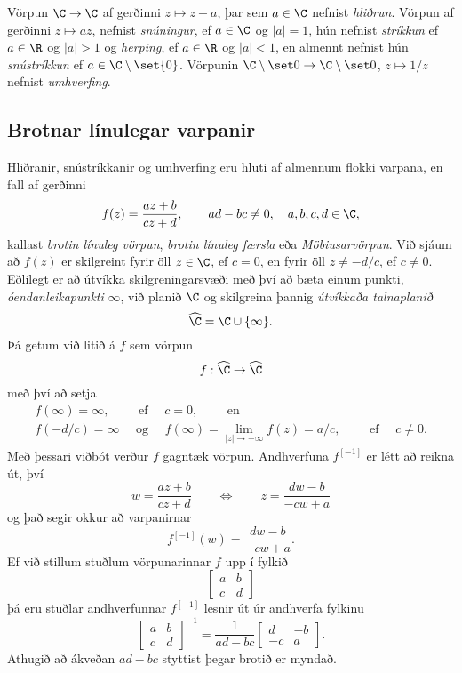 Vörpun $\C\to \C$ af gerðinni $z\mapsto z+a$, þar sem 
$a\in \C$ nefnist {\it hliðrun}.
Vörpun af gerðinni $z\mapsto az$, nefnist
{\it snúningur}, ef $a\in
\C$ og  $|a|=1$, hún nefnist {\it
stríkkun} ef $a\in
\R$ og $|a|>1$ og {\it herping}, ef  
$a\in \R$ og $|a|<1$, en almennt nefnist hún
{\it snústríkkun} ef $a\in \C\setminus\set{0}$.
Vörpunin $\C\setminus\set 0 \to \C\setminus\set 0$, 
$z\mapsto 1/z$ nefnist {\it
umhverfing}.

\bigskip
{}


\subsection*{Brotnar línulegar varpanir}

Hliðranir, snústríkkanir og umhverfing eru hluti af almennum flokki
varpana, en fall af gerðinni 
 $$f(z)=\dfrac{az+b}{cz+d}, \qquad ad-bc\neq 0, \quad a,b,c,d\in \C,
 $$
kallast {\it brotin línuleg vörpun},
{\it brotin línuleg færsla}
eða {\it Möbiusarvörpun}.  Við
sjáum að $f(z)$  er skilgreint fyrir öll $z\in \C$,  ef $c=0$, en fyrir
öll $z\neq -d/c$, ef $c\neq 0$.  
Eðlilegt er að útvíkka
skilgreningarsvæði með því að bæta einum punkti, {\it
óendanleikapunkti}   $\infty$, 
við planið $\C$ og skilgreina þannig {\it útvíkkaða talnaplanið}
$$
\widehat \C=\C\cup \{\infty\}.
$$
Þá getum við litið á $f$ sem vörpun
 $$f:\widehat \C \to \widehat \C
 $$
með því að setja
\begin{gather*}
f(\infty)=\infty, \qquad \text{ ef } \quad c=0, \qquad \text{ en }\\
f(-d/c)=\infty \quad \text{ og } \quad f(\infty)=\lim_{|z|\to+\infty}f(z)=a/c, \qquad
\text{ ef } \quad c\neq 0.
\end{gather*}
Með þessari viðbót verður $f$ gagntæk vörpun.  
Andhverfuna $f^{[-1]}$ er létt að
reikna út, því
 $$w=\dfrac{az+b}{cz+d} \qquad \Leftrightarrow \qquad
z=\dfrac{dw-b}{-cw+a}
 $$
og það  segir okkur að varpanirnar 
$$
f^{[-1]}(w)=\dfrac{dw-b}{-cw+a}.
$$
Ef við stillum stuðlum vörpunarinnar $f$ upp í fylkið
$$
\left[\begin{matrix} a&b\\c&d\end{matrix}\right]
$$
þá eru stuðlar andhverfunnar $f^{[-1]}$ lesnir út úr andhverfa fylkinu 
 $$\left[\begin{matrix} a&b\\c&d\end{matrix}\right]^{-1}=
\dfrac 1{ad-bc}\left[\begin{matrix} d&-b\\-c&a\end{matrix}\right].
 $$
Athugið að ákveðan $ad-bc$ styttist þegar brotið er myndað.

